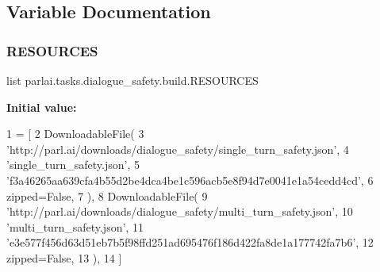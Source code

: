 \subsection{Variable Documentation}
\mbox{\label{namespaceparlai_1_1tasks_1_1dialogue__safety_1_1build_aff46ce1360a346f2f6fcb9d9a8cec433}} 
\subsubsection{\texorpdfstring{R\+E\+S\+O\+U\+R\+C\+ES}{RESOURCES}}
{\footnotesize\ttfamily list parlai.\+tasks.\+dialogue\+\_\+safety.\+build.\+R\+E\+S\+O\+U\+R\+C\+ES}

{\bfseries Initial value\+:}
\begin{DoxyCode}
1 =  [
2     DownloadableFile(
3         \textcolor{stringliteral}{'http://parl.ai/downloads/dialogue\_safety/single\_turn\_safety.json'},
4         \textcolor{stringliteral}{'single\_turn\_safety.json'},
5         \textcolor{stringliteral}{'f3a46265aa639cfa4b55d2be4dca4be1c596acb5e8f94d7e0041e1a54cedd4cd'},
6         zipped=\textcolor{keyword}{False},
7     ),
8     DownloadableFile(
9         \textcolor{stringliteral}{'http://parl.ai/downloads/dialogue\_safety/multi\_turn\_safety.json'},
10         \textcolor{stringliteral}{'multi\_turn\_safety.json'},
11         \textcolor{stringliteral}{'e3e577f456d63d51eb7b5f98ffd251ad695476f186d422fa8de1a177742fa7b6'},
12         zipped=\textcolor{keyword}{False},
13     ),
14 ]
\end{DoxyCode}
